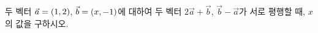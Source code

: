 두 벡터 $\vec{a}=(1{,}\mkern3mu\mathopen{}2)$, $\vec{b}=(x{,}\mkern3mu\mathopen{}-1)$에 대하여 두 벡터 $2\vec{a}+\vec{b}$, $\vec{b}-\vec{a}$가 서로 평행할 때, $x$의 값을 구하시오.
